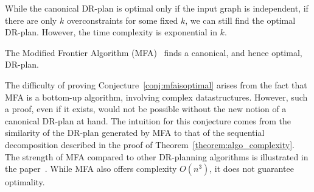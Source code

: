 \begin{remark}
    While the canonical DR-plan is optimal only if the input graph is independent, if there are only $k$ overconstraints for some fixed $k$, we can still find the optimal DR-plan. However, the time complexity is exponential in $k$.
\end{remark}

\begin{conjecture}
\label{conj:mfaisoptimal}
    The Modified Frontier Algorithm (MFA)~\cite{lomonosov2004graph} finds a canonical, and hence optimal, DR-plan.
\end{conjecture}

The difficulty of proving Conjecture~\ref{conj:mfaisoptimal} arises from the fact that MFA is a bottom-up algorithm, involving complex datastructures. However, such a proof, even if it exists, would not be possible without the new notion of a canonical DR-plan at hand. The intuition for this conjecture comes from the similarity of the DR-plan generated by MFA to that of the sequential decomposition described in the proof of Theorem~\ref{theorem:algo_complexity}. The strength of MFA compared to other DR-planning algorithms is illustrated in the paper~\cite{lomonosov2004graph}. While MFA also offers complexity $O(n^3)$, it does not guarantee optimality.
